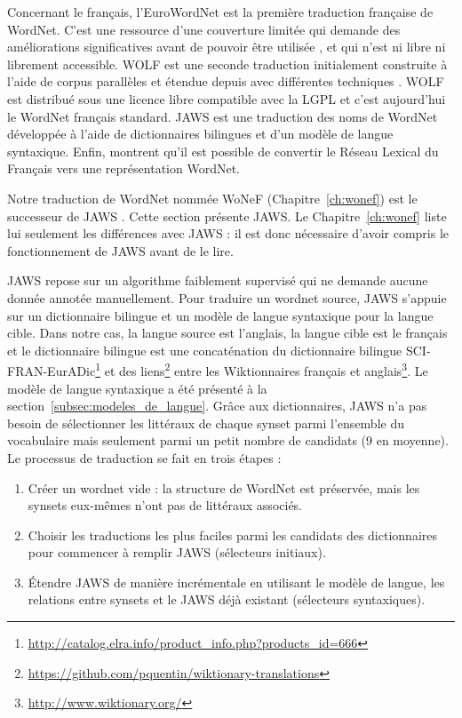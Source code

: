 Concernant le français, l'EuroWordNet \citep{vossen1998eurowordnet} est la
première traduction française de WordNet. C'est une ressource d'une couverture
limitée qui demande des améliorations significatives avant de pouvoir être
utilisée \citep{jacquin2006systemes}, et qui n'est ni libre ni librement
accessible. WOLF est une seconde traduction initialement construite à l'aide de
corpus parallèles \citep{sagot2008construction} et étendue depuis avec
différentes techniques \citep{apidianaki2012applying}. WOLF est distribué sous
une licence libre compatible avec la LGPL et c'est aujourd'hui le WordNet
français standard. JAWS \citep{mouton2010jaws} est une traduction des noms de
WordNet développée à l'aide de dictionnaires bilingues et d'un modèle de langue
syntaxique. Enfin, \cite{gader2014lexicon} montrent qu'il est possible de
convertir le Réseau Lexical du Français vers une représentation WordNet.


\label{subsec:jaws_translation_process}

Notre traduction de WordNet nommée WoNeF (Chapitre~\ref{ch:wonef}) est le
successeur de JAWS \citep{mouton2010jaws,mouton2010phd}. Cette section présente
JAWS. Le Chapitre~\ref{ch:wonef} liste lui seulement les différences avec JAWS
: il est donc nécessaire d'avoir compris le fonctionnement de JAWS avant de le
lire.

JAWS repose sur un algorithme faiblement supervisé qui ne demande aucune donnée
annotée manuellement. Pour traduire un wordnet source, JAWS s'appuie sur un
dictionnaire bilingue et un modèle de langue syntaxique pour la langue cible.
Dans notre cas, la langue source est l'anglais, la langue cible est le français
et le dictionnaire bilingue est une concaténation du dictionnaire bilingue
SCI-FRAN-EurADic\footnote{\url{http://catalog.elra.info/product_info.php?products_id=666}}
et des
liens\footnote{\url{https://github.com/pquentin/wiktionary-translations}} entre
les Wiktionnaires français et
anglais\footnote{\url{http://www.wiktionary.org/}}. Le modèle de langue
syntaxique a été présenté à la section~\ref{subsec:modeles_de_langue}. Grâce
aux dictionnaires, JAWS n'a pas besoin de sélectionner les littéraux de chaque
synset parmi l'ensemble du vocabulaire mais seulement parmi un petit nombre de
candidats (9 en moyenne).  Le processus de traduction se fait en trois étapes :

\begin{enumerate}
    \item Créer un wordnet vide : la structure de WordNet est préservée, mais
        les synsets eux-mêmes n'ont pas de littéraux associés.
    \item Choisir les traductions les plus faciles parmi les candidats des
        dictionnaires pour commencer à remplir JAWS (sélecteurs initiaux).
    \item Étendre JAWS de manière incrémentale en utilisant le modèle de
        langue, les relations entre synsets et le JAWS déjà existant
        (sélecteurs syntaxiques).
\end{enumerate}

